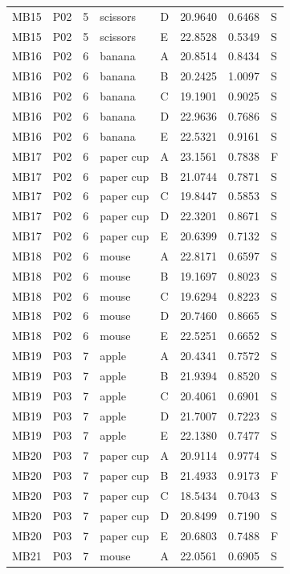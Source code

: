 \documentclass[11pt]{article}
\begin{document}
\begin{longtable}{lll llrrl}
MB15 & P02 & 5 & scissors & D & 20.9640 & 0.6468 & S \\
MB15 & P02 & 5 & scissors & E & 22.8528 & 0.5349 & S \\
MB16 & P02 & 6 & banana & A & 20.8514 & 0.8434 & S \\
MB16 & P02 & 6 & banana & B & 20.2425 & 1.0097 & S \\
MB16 & P02 & 6 & banana & C & 19.1901 & 0.9025 & S \\
MB16 & P02 & 6 & banana & D & 22.9636 & 0.7686 & S \\
MB16 & P02 & 6 & banana & E & 22.5321 & 0.9161 & S \\
MB17 & P02 & 6 & paper cup & A & 23.1561 & 0.7838 & F \\
MB17 & P02 & 6 & paper cup & B & 21.0744 & 0.7871 & S \\
MB17 & P02 & 6 & paper cup & C & 19.8447 & 0.5853 & S \\
MB17 & P02 & 6 & paper cup & D & 22.3201 & 0.8671 & S \\
MB17 & P02 & 6 & paper cup & E & 20.6399 & 0.7132 & S \\
MB18 & P02 & 6 & mouse & A & 22.8171 & 0.6597 & S \\
MB18 & P02 & 6 & mouse & B & 19.1697 & 0.8023 & S \\
MB18 & P02 & 6 & mouse & C & 19.6294 & 0.8223 & S \\
MB18 & P02 & 6 & mouse & D & 20.7460 & 0.8665 & S \\
MB18 & P02 & 6 & mouse & E & 22.5251 & 0.6652 & S \\
MB19 & P03 & 7 & apple & A & 20.4341 & 0.7572 & S \\
MB19 & P03 & 7 & apple & B & 21.9394 & 0.8520 & S \\
MB19 & P03 & 7 & apple & C & 20.4061 & 0.6901 & S \\
MB19 & P03 & 7 & apple & D & 21.7007 & 0.7223 & S \\
MB19 & P03 & 7 & apple & E & 22.1380 & 0.7477 & S \\
MB20 & P03 & 7 & paper cup & A & 20.9114 & 0.9774 & S \\
MB20 & P03 & 7 & paper cup & B & 21.4933 & 0.9173 & F \\
MB20 & P03 & 7 & paper cup & C & 18.5434 & 0.7043 & S \\
MB20 & P03 & 7 & paper cup & D & 20.8499 & 0.7190 & S \\
MB20 & P03 & 7 & paper cup & E & 20.6803 & 0.7488 & F \\
MB21 & P03 & 7 & mouse & A & 22.0561 & 0.6905 & S \\

\end{longtable}
\end{document}

